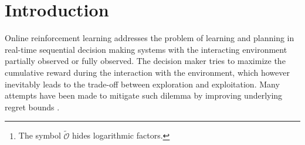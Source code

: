 \documentclass{article}
\theoremstyle{plain}
\theoremstyle{definition}
\theoremstyle{remark}
\begin{document}
\printAffiliationsAndNotice{\icmlEqualContribution} %

\begin{abstract}
We propose a Reward-Weighted Posterior Sampling of Policy (RWPSP) algorithm to tackle the classic trade-off problem between exploration and exploitation under finite Markov decision processes (MDPs). The Thompson sampling method so far has only considered posterior sampling over transition probabilities, which is hard to gain the globally sub-optimal rewards. RWPSP runs posterior sampling over stationary policy distributions instead of transition probabilities, and meanwhile keeps transition probabilities updated.  Particularly, we leverage both relevant count functions and reward-weighting to online update the policy posterior, aiming to balance between local and long-term policy distributions for a globally near-optimal game value. Theoretically, we establish a bound of $\tilde{\mathcal{O}}(C\sqrt{T}/S^{2})$\footnote{The symbol $\tilde{\mathcal{O}}$ hides logarithmic factors.} on the total regret in time horizon $T$ with $C/S^{2} < D\sqrt{SA}$ satisfied in general, where $S$ and $A$ represents the sizes of state and action spaces, respectively, $D$ the diameter. This matches the best regret bound thus far for MDPs. Experimental results corroborate our theoretical results and show the advantage of our algorithm over baselines in terms of efficiency.
\end{abstract}


\section{Introduction}
Online reinforcement learning \citep{NIPS2017_36e729ec} addresses the problem of learning and planning in real-time sequential decision making systems with the interacting environment partially observed or fully observed. The decision maker tries to maximize the cumulative reward during the interaction with the environment, which however inevitably leads to the trade-off between exploration and exploitation. Many attempts have been made to mitigate such dilemma by improving underlying regret bounds \citep{zhang2020almost}\citep{menard2021ucb}\citep{zhang2021reinforcement}\citep{zhang2022horizon}\citep{agrawal2021improved}. 

\end{document}

